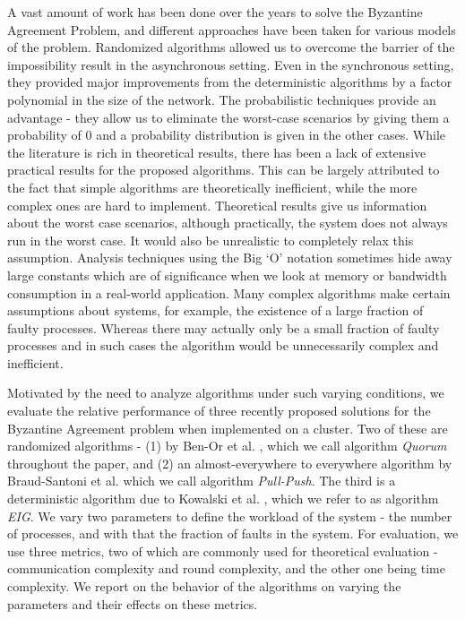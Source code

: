 A vast amount of work has been done over the years to solve the Byzantine Agreement Problem, and different approaches have been taken for various models of the problem. Randomized algorithms allowed us to overcome the barrier of the impossibility result in the asynchronous setting. Even in the synchronous setting, they provided major improvements from the deterministic algorithms by a factor polynomial in the size of the network. The probabilistic techniques provide an advantage - they allow us to eliminate the worst-case scenarios by giving them a probability of $0$ and a probability distribution is given in the other cases. While the literature is rich in theoretical results, there has been a lack of extensive practical results for the proposed algorithms. This can be largely attributed to the fact that simple algorithms are theoretically inefficient, while the more complex ones are hard to implement. Theoretical results give us information about the worst case scenarios, although practically, the system does not always run in the worst case. It would also be unrealistic to completely relax this assumption. Analysis techniques using the Big `O' notation sometimes hide away large constants which are of significance when we look at memory or bandwidth consumption in a real-world application. Many complex algorithms make certain assumptions about systems, for example, the existence of a large fraction of faulty processes. Whereas there may actually only be a small fraction of faulty processes and in such cases the algorithm would be unnecessarily complex and inefficient.

Motivated by the need to analyze algorithms under such varying conditions, we evaluate the relative performance of three recently proposed solutions for the Byzantine Agreement problem when implemented on a cluster. Two of these are randomized algorithms - (1) by Ben-Or et al. \cite{BPV06}, which we call algorithm \textit{Quorum} throughout the paper, and (2) an almost-everywhere to everywhere algorithm by Braud-Santoni et al. \cite{BGH13} which we call algorithm \textit{Pull-Push}. The third is a deterministic algorithm due to Kowalski et al. \cite{KM13}, which we refer to as algorithm \textit{EIG}. We vary two parameters to define the workload of the system - the number of processes, and with that the fraction of faults in the system. For evaluation, we use three metrics, two of which are commonly used for theoretical evaluation - communication complexity and round complexity, and the other one being time complexity. We report on the behavior of the algorithms on varying the parameters and their effects on these metrics. 

